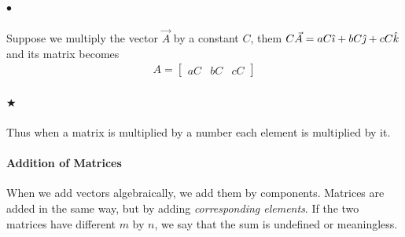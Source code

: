            \paragraph{$\bullet$} Suppose we multiply the vector 
            $\vec{A}$ by a constant $C$, them $C\vec{A} = aC\hat{\imath}  + bC\hat{\jmath}  + cC\hat{k} $ and its matrix becomes
            \begin{align}
                A = \begin{bmatrix}
                    aC & bC & cC
                \end{bmatrix}
            \end{align}
            \paragraph{$\bigstar$}
            Thus when a matrix is multiplied by a number each element is multiplied by it.

            \paragraph{Addition of Matrices} %
            \label{par:Addition of Matrices}
            When we add vectors algebraically, we add them by components. Matrices are added in the
            same way, but by adding \textit{corresponding elements}. If the two matrices have different $m$ by $n$,
            we say that the sum is undefined or meaningless.

